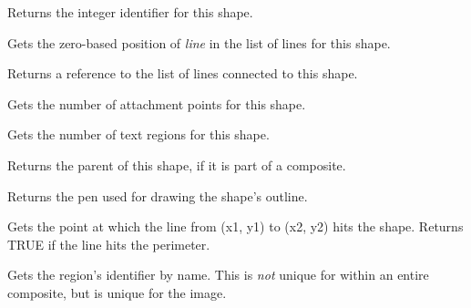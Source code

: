 

Returns the integer identifier for this shape.

\label{wxshapegetlineposition}


Gets the zero-based position of {\it line} in the list of lines for this shape.



Returns a reference to the list of lines connected to this shape.

\label{wxshapegetnumberofattachments}


Gets the number of attachment points for this shape.



Gets the number of text regions for this shape.



Returns the parent of this shape, if it is part of a composite.



Returns the pen used for drawing the shape's outline.



Gets the point at which the line from (x1, y1) to (x2, y2) hits the shape. Returns TRUE if the
line hits the perimeter.

\label{getregionid}


Gets the region's identifier by name. This is {\it not} unique for within an entire composite, but
is unique for the image.


